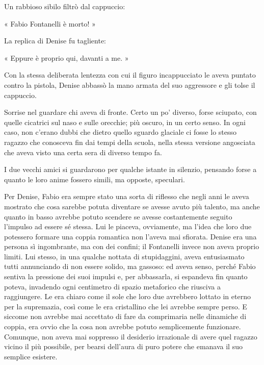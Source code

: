 Un rabbioso sibilo filtrò dal cappuccio:

« Fabio Fontanelli è morto! »

La replica di Denise fu tagliente:

« Eppure è proprio qui, davanti a me. »

Con la stessa deliberata lentezza con cui il figuro incappucciato le aveva puntato contro la pistola, Denise abbassò la mano armata del suo aggressore e gli tolse il cappuccio.

Sorrise nel guardare chi aveva di fronte. Certo un po' diverso, forse sciupato, con quelle cicatrici sul naso e sulle orecchie; più oscuro, in un certo senso. In ogni caso, non c'erano dubbi che dietro quello sguardo glaciale ci fosse lo stesso ragazzo che conosceva fin dai tempi della scuola, nella stessa versione angosciata che aveva visto una certa sera di diverso tempo fa.

I due vecchi amici si guardarono per qualche istante in silenzio, pensando forse a quanto le loro anime fossero simili, ma opposte, speculari.

Per Denise, Fabio era sempre stato una sorta di riflesso che negli anni le aveva mostrato che cosa sarebbe potuta diventare se avesse avuto più talento, ma anche quanto in basso avrebbe potuto scendere se avesse costantemente seguito l'impulso ad essere sé stessa. Lui le piaceva, ovviamente, ma l'idea che loro due potessero formare una coppia romantica non l'aveva mai sfiorata. Denise era una persona sì ingombrante, ma con dei confini; il Fontanelli invece non aveva proprio limiti. Lui stesso, in una qualche nottata di stupidaggini, aveva entusiasmato tutti annunciando di non essere solido, ma gassoso: ed aveva senso, perché Fabio sentiva la pressione dei suoi impulsi e, per abbassarla, si espandeva fin quanto poteva, invadendo ogni centimetro di spazio metaforico che riusciva a raggiungere. Le era chiaro come il sole che loro due avrebbero lottato in eterno per la supremazia, così come le era cristallino che lei avrebbe sempre perso. E siccome non avrebbe mai accettato di fare da comprimaria nelle dinamiche di coppia, era ovvio che la cosa non avrebbe potuto semplicemente funzionare. Comunque, non aveva mai soppresso il desiderio irrazionale di avere quel ragazzo vicino il più possibile, per bearsi dell'aura di puro potere che emanava il suo semplice esistere.

